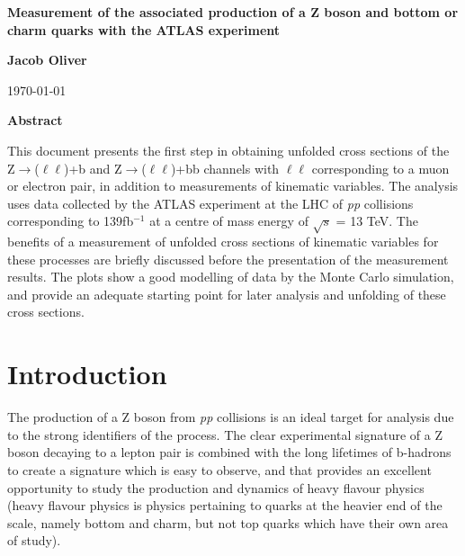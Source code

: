 \documentclass[12pt,a4paper,epsf,portrait,times,epsfig]{report}
\begin{document}
	\begin{center}
		{\Large \bf Measurement of the associated production of a Z boson and bottom or charm quarks with the ATLAS experiment}
	\end{center}
		
		\vspace{3.0cm}
		
	\begin{center}
		{\Large \bf Jacob Oliver}
	\end{center}

		\vspace{1.5cm}
		
	\begin{center}
		\today
	\end{center}
		
		\vspace{3.0cm}
		
		
	\begin{center}
		{\large \bf Abstract}
	\end{center}
	This document presents the first step in obtaining unfolded cross sections of the Z$\rightarrow$($\ell\ell$)+b and Z$\rightarrow$($\ell\ell$)+bb channels with $\ell\ell$ corresponding to a muon or electron pair, in addition to measurements of kinematic variables. The analysis uses data collected by the ATLAS experiment at the LHC of \textit{pp} collisions corresponding to 139fb$^{-1}$ at a centre of mass energy of $\sqrt{s}$ = 13 TeV. The benefits of a measurement of unfolded cross sections of kinematic variables for these processes are briefly discussed before the presentation of the measurement results. The plots show a good modelling of data by the Monte Carlo simulation, and provide an adequate starting point for later analysis and unfolding of these cross sections.   
	
	\newpage
	\tableofcontents
	\newpage
	
	\chapter{Introduction}
	
	The production of a Z boson from \textit{pp} collisions is an ideal target for analysis due to the strong identifiers of the process. The clear experimental signature of a Z boson decaying to a lepton pair is combined with the long lifetimes of b-hadrons to create a signature which is easy to observe, and that provides an excellent opportunity to study the production and dynamics of heavy flavour physics (heavy flavour physics is physics pertaining to quarks at the heavier end of the scale, namely bottom and charm, but not top quarks which have their own area of study). \par
	
\end{document}
